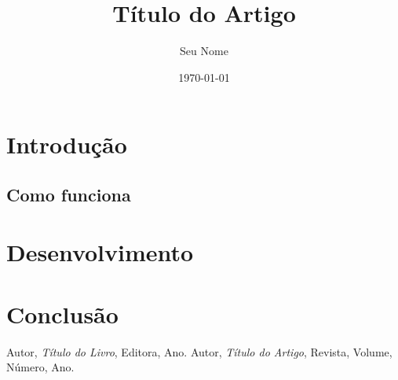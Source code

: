 \documentclass[a4paper,12pt]{article}
\title{Título do Artigo}
\author{Seu Nome}
\date{\today}
\begin{document}
\maketitle
\begin{abstract}
\lipsum[1]
\end{abstract}

\newpage

\tableofcontents
\newpage

\section{Introdução}
\lipsum[2-3]

\subsection{Como funciona}
\lipsum[1]

\section{Desenvolvimento}
\lipsum[4-6]

\newpage

\section{Conclusão}
\lipsum[7]
\newpage

\begin{thebibliography}{9}
 Autor, \textit{Título do Livro}, Editora, Ano.
 Autor, \textit{Título do Artigo}, Revista, Volume, Número, Ano.
\end{thebibliography}
\end{document}
